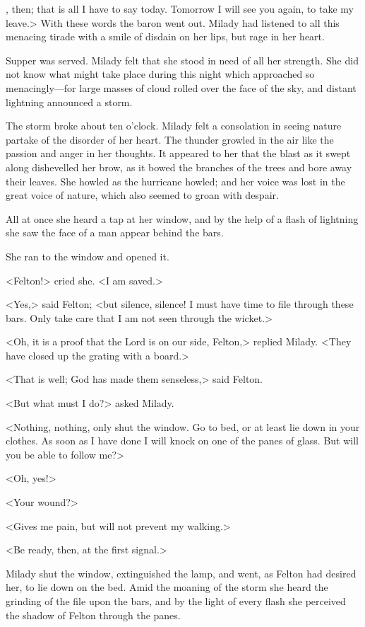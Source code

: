 , then; that is all I have to say today. Tomorrow I will see you again, to take my leave.> With these words the baron went out. Milady had listened to all this menacing tirade with a smile of disdain on her lips, but rage in her heart. 

Supper was served. Milady felt that she stood in need of all her strength. She did not know what might take place during this night which approached so menacingly—for large masses of cloud rolled over the face of the sky, and distant lightning announced a storm. 

The storm broke about ten o'clock. Milady felt a consolation in seeing nature partake of the disorder of her heart. The thunder growled in the air like the passion and anger in her thoughts. It appeared to her that the blast as it swept along dishevelled her brow, as it bowed the branches of the trees and bore away their leaves. She howled as the hurricane howled; and her voice was lost in the great voice of nature, which also seemed to groan with despair. 

All at once she heard a tap at her window, and by the help of a flash of lightning she saw the face of a man appear behind the bars. 

She ran to the window and opened it. 

<Felton!> cried she. <I am saved.> 

<Yes,> said Felton; <but silence, silence! I must have time to file through these bars. Only take care that I am not seen through the wicket.> 

<Oh, it is a proof that the Lord is on our side, Felton,> replied Milady. <They have closed up the grating with a board.> 

<That is well; God has made them senseless,> said Felton. 

<But what must I do?> asked Milady. 

<Nothing, nothing, only shut the window. Go to bed, or at least lie down in your clothes. As soon as I have done I will knock on one of the panes of glass. But will you be able to follow me?> 

<Oh, yes!> 

<Your wound?> 

<Gives me pain, but will not prevent my walking.> 

<Be ready, then, at the first signal.> 

Milady shut the window, extinguished the lamp, and went, as Felton had desired her, to lie down on the bed. Amid the moaning of the storm she heard the grinding of the file upon the bars, and by the light of every flash she perceived the shadow of Felton through the panes. 

